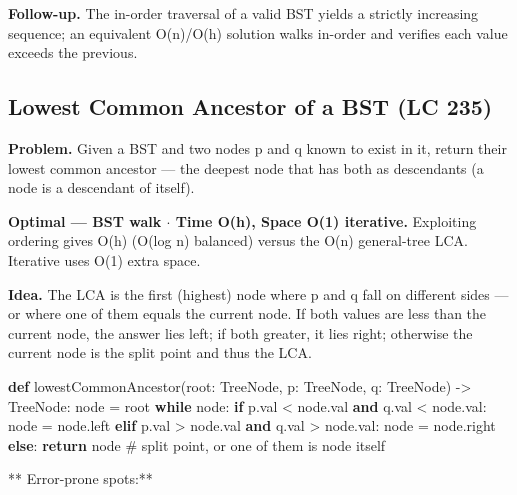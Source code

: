 \documentclass[11pt]{article}
\newenvironment{Shaded}{\begin{snugshade}}{\end{snugshade}}
\newcommand{\CommentTok}[1]{\textcolor[rgb]{0.48,0.49,0.49}{#1}}
\newcommand{\ControlFlowTok}[1]{\textcolor[rgb]{0.99,0.74,0.29}{\textbf{#1}}}
\newcommand{\KeywordTok}[1]{\textcolor[rgb]{0.81,0.81,0.76}{\textbf{#1}}}
\newcommand{\NormalTok}[1]{\textcolor[rgb]{0.81,0.81,0.76}{#1}}
\newcommand{\OperatorTok}[1]{\textcolor[rgb]{0.81,0.81,0.76}{#1}}
\begin{document}
\textbf{Follow-up.} The in-order traversal of a valid BST yields a strictly increasing sequence; an equivalent O(n)/O(h) solution walks in-order and verifies each value exceeds the previous.

\subsection{Lowest Common Ancestor of a BST (LC 235)}\label{lowest-common-ancestor-of-a-bst-lc-235}

\textbf{Problem.} Given a BST and two nodes p and q known to exist in it, return their lowest common ancestor --- the deepest node that has both as descendants (a node is a descendant of itself).

\textbf{Optimal --- BST walk \(\cdot\) Time O(h), Space O(1) iterative.} Exploiting ordering gives O(h) (O(log n) balanced) versus the O(n) general-tree LCA. Iterative uses O(1) extra space.

\textbf{Idea.} The LCA is the first (highest) node where p and q fall on different sides --- or where one of them equals the current node. If both values are less than the current node, the answer lies left; if both greater, it lies right; otherwise the current node is the split point and thus the LCA.


\begin{Shaded}
\begin{Highlighting}[]
\KeywordTok{def}\NormalTok{ lowestCommonAncestor(root: TreeNode, p: TreeNode, q: TreeNode) }\OperatorTok{{-}\textgreater{}}\NormalTok{ TreeNode:}
\NormalTok{    node }\OperatorTok{=}\NormalTok{ root}
    \ControlFlowTok{while}\NormalTok{ node:}
        \ControlFlowTok{if}\NormalTok{ p.val }\OperatorTok{\textless{}}\NormalTok{ node.val }\KeywordTok{and}\NormalTok{ q.val }\OperatorTok{\textless{}}\NormalTok{ node.val:}
\NormalTok{            node }\OperatorTok{=}\NormalTok{ node.left}
        \ControlFlowTok{elif}\NormalTok{ p.val }\OperatorTok{\textgreater{}}\NormalTok{ node.val }\KeywordTok{and}\NormalTok{ q.val }\OperatorTok{\textgreater{}}\NormalTok{ node.val:}
\NormalTok{            node }\OperatorTok{=}\NormalTok{ node.right}
        \ControlFlowTok{else}\NormalTok{:}
            \ControlFlowTok{return}\NormalTok{ node          }\CommentTok{\# split point, or one of them is node itself}
\end{Highlighting}
\end{Shaded}

** Error-prone spots:**
\end{document}

